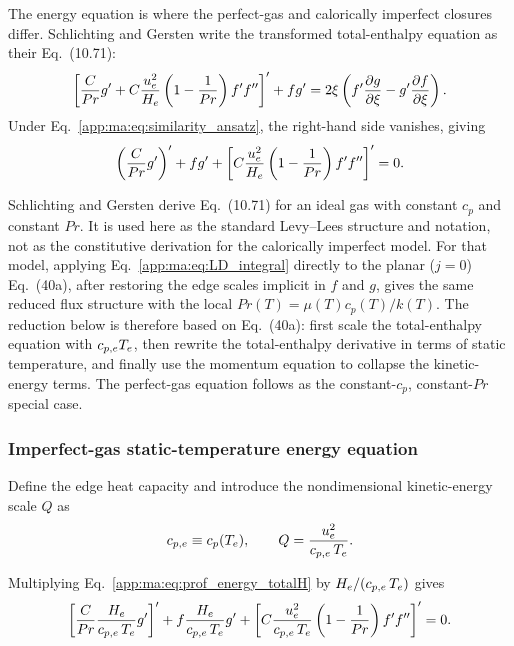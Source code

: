 The energy equation is where the perfect-gas and calorically imperfect closures differ. Schlichting and Gersten write the transformed total-enthalpy equation as their Eq.~(10.71):
\begin{equation}
  \left[
    \frac{C}{Pr}g'
    +C\frac{u_e^2}{H_e}\left(1-\frac{1}{Pr}\right)f'f''
  \right]'
  +fg'
  =2\xi\left(
    f'\frac{\partial g}{\partial\xi}
    -g'\frac{\partial f}{\partial\xi}
  \right).
  \label{app:ma:eq:levy_lees_energy_general}
\end{equation}
Under Eq.~\eqref{app:ma:eq:similarity_ansatz}, the right-hand side vanishes, giving
\begin{equation}
  \left(\frac{C}{Pr}g'\right)'
  +fg'
  +\left[
    C\frac{u_e^2}{H_e}\left(1-\frac{1}{Pr}\right)f'f''
  \right]'=0.
  \label{app:ma:eq:prof_energy_totalH}
\end{equation}

Schlichting and Gersten derive Eq.~(10.71) for an ideal gas with constant \(c_p\) and constant \(Pr\). It is used here as the standard Levy--Lees structure and notation, not as the constitutive derivation for the calorically imperfect model. For that model, applying Eq.~\eqref{app:ma:eq:LD_integral} directly to the planar (\(j=0\)) \maAppName{} Eq.~(40a), after restoring the edge scales implicit in \(f\) and \(g\), gives the same reduced flux structure with the local \(Pr(T)=\mu(T)c_p(T)/k(T)\). The reduction below is therefore based on \maAppName{} Eq.~(40a): first scale the total-enthalpy equation with \(c_{p,e}T_e\), then rewrite the total-enthalpy derivative in terms of static temperature, and finally use the momentum equation to collapse the kinetic-energy terms. The perfect-gas equation follows as the constant-\(c_p\), constant-\(Pr\) special case.

\subsubsection{Imperfect-gas static-temperature energy equation}
\label{app:ma:subsubsec:derv_imperfect_energy_similarity}

Define the edge heat capacity and introduce the nondimensional kinetic-energy scale \(Q\) as
\begin{equation}
  c_{p,e} \equiv c_p(T_e),
  \qquad
  Q=\frac{u_e^2}{c_{p,e}\,T_e}.
  \label{app:ma:eq:Q_general}
\end{equation}

Multiplying Eq.~\eqref{app:ma:eq:prof_energy_totalH} by \(H_e/(c_{p,e}\,T_e)\) gives
\begin{equation}
  \left[
    \frac{C}{Pr}
    \frac{H_e}{c_{p,e}\,T_e}g'
  \right]'
  +
  f\frac{H_e}{c_{p,e}\,T_e}g'
  +
  \left[
    C\frac{u_e^2}{c_{p,e}\,T_e}
    \left(1-\frac{1}{Pr}\right)f'f''
  \right]'=0.
  \label{app:ma:eq:energy_scaled_g}
\end{equation}

